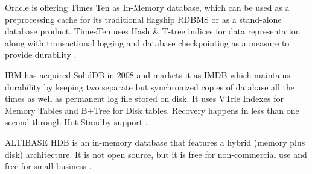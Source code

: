 \documentclass[10pt]{article} %
\begin{document}
Oracle is offering Times Ten as In-Memory database, which can be used as a preprocessing cache for its traditional flagship RDBMS or as a stand-alone database product. TimesTen uses Hash \& T-tree indices for data representation along with transactional logging and database checkpointing as a measure to provide durability \cite{oracleTimesTen}.

IBM has acquired SolidDB in 2008 and markets it as IMDB which maintains durability by keeping two separate but synchronized copies of database all the times as well as permanent log file stored on disk. It uses VTrie Indexes for Memory Tables and B+Tree for Disk tables. Recovery happens in less than one second through Hot Standby support \cite{IBMredbookSolidDB}. 

ALTIBASE HDB is an in-memory database that features a hybrid (memory plus disk) architecture. It is not open source, but it is free for non-commercial use and free for small business \cite{altibaseHDB}.
\end{document}
